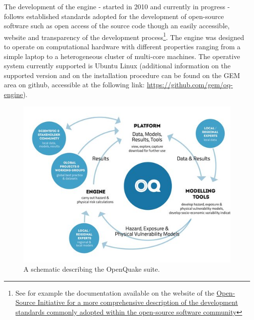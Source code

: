 The development of the engine - started in 2010 and currently in progress -
follows established standards adopted for the development of open-source
software such as open access of the source code though an easily accessible,
website and transparency of the development process\footnote{See for example the
    documentation available on the website of the
    \href{http://opensource.org/osr}{Open-Source Initiative for a 
more comprehensive description of the development standards commonly 
adopted within the open-source software community}}.
The engine was designed to operate on computational hardware with different properties
ranging from a simple laptop to a heterogeneous cluster of multi-core machines.
The operative system currently supported is Ubuntu Linux (additional
information on the supported version and on the installation procedure can 
be found on the GEM area on github, accessible at the following link:
\href{https://github.com/gem/oq-engine}{https://github.com/gem/oq-engine}). 
\begin{figure}[!ht]
\centering
\includegraphics[width=14cm]{./Pictures/intro/OQ-workflows.jpg}
\caption{A schematic describing the OpenQuake suite.}
\label{fig:oq_platform}
\end{figure}
%
